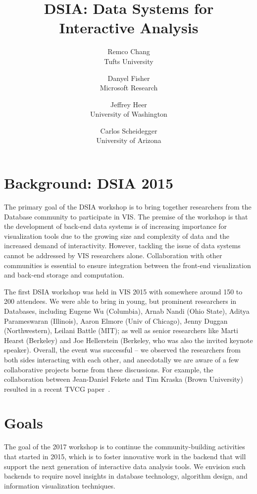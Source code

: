 \documentclass[journal]{vgtc}                %
\title{DSIA: Data Systems for Interactive Analysis}
\author{Remco Chang\\
	\scriptsize Tufts University 
	\and Danyel Fisher\\
	\scriptsize Microsoft Research 
	\and Jeffrey Heer\\
	\scriptsize University of Washington
 	\and Carlos Scheidegger\\
 	\scriptsize University of Arizona}
\begin{document}
\maketitle
\section{Background: DSIA 2015}
The primary goal of the DSIA workshop is to bring together researchers from the Database community to participate in VIS.  
The premise of the workshop is that the development of back-end data systems is of increasing importance for visualization tools due to the growing size and complexity of data and the increased demand of interactivity. 
However, tackling the issue of data systems cannot be addressed by VIS researchers alone. 
Collaboration with other communities is essential to ensure integration between the front-end visualization and back-end storage and computation.

The first DSIA workshop was held in VIS 2015 with somewhere around 150 to 200 attendees. 
We were able to bring in young, but prominent researchers in Databases, including Eugene Wu (Columbia), Arnab Nandi (Ohio State), Aditya Parameswaran (Illinois), Aaron Elmore (Univ of Chicago), Jenny Duggan (Northwestern), Leilani Battle (MIT); as well as senior researchers like Marti Hearst (Berkeley) and Joe Hellerstein (Berkeley, who was also the invited keynote speaker). 
Overall, the event was successful -- we observed the researchers from both sides interacting with each other, and anecdotally we are aware of a few collaborative projects borne from these discussions. 
For example, the collaboration between Jean-Daniel Fekete and Tim Kraska (Brown University) resulted in a recent TVCG paper~.


\section{Goals}
The goal of the 2017 workshop is to continue the community-building activities that started in 2015, which is to foster innovative work in the backend that will support the next generation of interactive data analysis tools. 
We envision such backends to require novel insights in database technology, algorithm design, and information visualization techniques.
\end{document}
